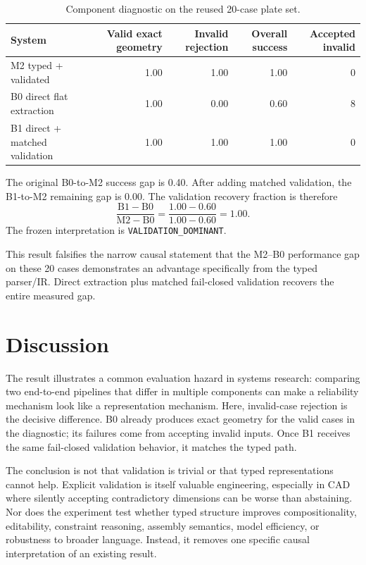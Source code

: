 \documentclass[10pt]{article}
\begin{document}
\begin{table}[h]
\centering
\caption{Component diagnostic on the reused 20-case plate set.}
\label{tab:ablation}
\begin{tabular}{lrrrr}
\toprule
System & Valid exact geometry & Invalid rejection & Overall success & Accepted invalid \\
\midrule
M2 typed + validated & 1.00 & 1.00 & 1.00 & 0 \\
B0 direct flat extraction & 1.00 & 0.00 & 0.60 & 8 \\
B1 direct + matched validation & 1.00 & 1.00 & 1.00 & 0 \\
\bottomrule
\end{tabular}
\end{table}

The original B0-to-M2 success gap is 0.40. After adding matched validation, the B1-to-M2 remaining gap is 0.00. The validation recovery fraction is therefore
\begin{equation}
\frac{\mathrm{B1}-\mathrm{B0}}{\mathrm{M2}-\mathrm{B0}} = \frac{1.00-0.60}{1.00-0.60}=1.00.
\end{equation}
The frozen interpretation is \texttt{VALIDATION\_DOMINANT}.

This result falsifies the narrow causal statement that the M2--B0 performance gap on these 20 cases demonstrates an advantage specifically from the typed parser/IR. Direct extraction plus matched fail-closed validation recovers the entire measured gap.

\section{Discussion}
The result illustrates a common evaluation hazard in systems research: comparing two end-to-end pipelines that differ in multiple components can make a reliability mechanism look like a representation mechanism. Here, invalid-case rejection is the decisive difference. B0 already produces exact geometry for the valid cases in the diagnostic; its failures come from accepting invalid inputs. Once B1 receives the same fail-closed validation behavior, it matches the typed path.

The conclusion is not that validation is trivial or that typed representations cannot help. Explicit validation is itself valuable engineering, especially in CAD where silently accepting contradictory dimensions can be worse than abstaining. Nor does the experiment test whether typed structure improves compositionality, editability, constraint reasoning, assembly semantics, model efficiency, or robustness to broader language. Instead, it removes one specific causal interpretation of an existing result.
\end{document}
